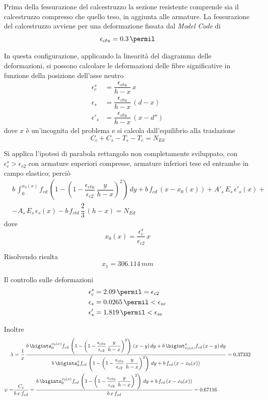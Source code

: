 Prima della fessurazione del calcestruzzo la sezione resistente comprende sia il calcestruzzo compresso che quello teso, in aggiunta alle armature. La fessurazione del calcestruzzo avviene per una deformazione fissata dal \emph{Model Code} di
\[
\epsilon_{ctu} = 0.3\,\permil
\]

In questa configurazione, applicando la linearità del diagramma delle deformazioni, si possono calcolare le deformazioni delle fibre significative in funzione della posizione dell'asse neutro 
\begin{align*}
	\epsilon_c^s &= \dfrac{\epsilon_{ctu}}{h-x}\,x\\
	\epsilon_s &= \dfrac{\epsilon_{ctu}}{h-x}\,(d-x)\\
	\epsilon'_s &= \dfrac{\epsilon_{ctu}}{h-x}\,(x-d'')
\end{align*}
dove $x$ è un'incognita del problema e si calcola dall'equilibrio alla traslazione
\[
C_c + C_s - T_s - T_c = N_{Ed}
\]

Si applica l'ipotesi di parabola rettangolo non completamente sviluppato, con $\epsilon_c^s > \epsilon_{c2}$ con armature superiori compresse, armature inferiori tese ed entrambe in campo elastico; perciò
\begin{align*}
&b\,\int_0^{x_0(x)} f_{cd}\,\left(1-\left(1-\dfrac{\epsilon_{ctu}}{\epsilon_{c2}}\,\dfrac{y}{h-x}\right)^2\right)\,dy + b\,f_{cd}\,\left(x-x_0(x)\right) + A'_s\,E_s\,\epsilon'_s(x)+\\ 
&- A_s\,E_s\,\epsilon_s (x) - b\,f_{ctd}\,\dfrac{2}{3}\,(h-x) = N_{Ed}
\end{align*}
dove
\[
x_0 (x) = \dfrac{\epsilon_c^s}{\epsilon_{c2}}\,x
\]

Risolvendo risulta 
\[ x_1 = 306.114\,mm\]

Il controllo sulle deformazioni
\begin{align*}
	\epsilon_c^s &= 2.09\,\permil = \epsilon_{c2}\\
	\epsilon_s &= 0.0265\,\permil < \epsilon_{se}\\
	\epsilon'_s &= 1.819\,\permil < \epsilon_{se}
\end{align*}

Inoltre
\begin{align*}
	\lambda &= \dfrac{1}{x}\,\dfrac{b\,\bigints_0^{x_0(x)} f_{cd}\,\left(1-\left(1-\dfrac{\epsilon_{ctu}}{\epsilon_{c2}}\,\dfrac{y}{h-x}\right)^2\right)\,(x-y)\,dy + b\,\bigint_{x_0(x)}^x f_{cd}\,(x-y)\,dy}{b\,\bigints_0^x f_{cd}\,\left(1-\left(1-\dfrac{\epsilon_{ctu}}{\epsilon_{c2}}\,\dfrac{y}{h-x}\right)^2\right)\,dy + b\,f_{cd}\,(x-x_0(x))} = 0.37332\\
	\psi =& \dfrac{C_c}{b\,x\,f_{cd}} = \dfrac{b\,\bigints_0^{x_0(x)} f_{cd}\,\left(1-\left(1-\dfrac{\epsilon_{ctu}}{\epsilon_{c2}}\,\dfrac{y}{h-x}\right)^2\right)\,dy + b\,f_{cd}\,(x-x_0(x))}{b\,x\,f_{cd}} = 0.67116
\end{align*}

